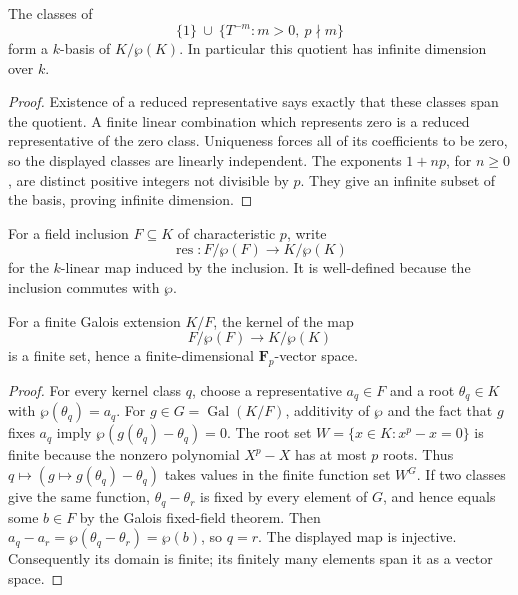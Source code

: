 \begin{lemma}
\label{lem:artin-schreier-quotient-basis}
\leanok
The classes of
\[
 \{1\}\ \cup\ \{T^{-m}:m>0,\ p\nmid m\}
\]
form a $k$-basis of $K/\wp(K)$. In particular this quotient
has infinite dimension over $k$.
\end{lemma}

\begin{proof}
Existence of a reduced representative says exactly that these
classes span the quotient. A finite linear combination which
represents zero is a reduced representative of the zero
class. Uniqueness forces all of its coefficients to be zero,
so the displayed classes are linearly independent.
The exponents $1+np$, for $n\ge0$, are distinct positive
integers not divisible by $p$. They give an infinite subset
of the basis, proving infinite dimension.
\end{proof}

For a field inclusion $F\subseteq K$ of characteristic $p$,
write
\[
 \operatorname{res}:F/\wp(F)\longrightarrow K/\wp(K)
\]
for the $k$-linear map induced by the inclusion. It is
well-defined because the inclusion commutes with $\wp$.

\begin{lemma}
\label{lem:artin-schreier-restriction-finite-kernel}
\leanok
For a finite Galois extension $K/F$, the kernel of the map
\[
 F/\wp(F)\longrightarrow K/\wp(K)
\]
is a finite set, hence a finite-dimensional $\mathbf F_p$-vector space.
\end{lemma}

\begin{proof}
For every kernel class $q$, choose a representative $a_q\in F$
and a root $\theta_q\in K$ with $\wp(\theta_q)=a_q$.
For $g\in G=\operatorname{Gal}(K/F)$, additivity of $\wp$
and the fact that $g$ fixes $a_q$ imply
$\wp(g(\theta_q)-\theta_q)=0$.
The root set $W=\{x\in K:x^p-x=0\}$ is finite because the
nonzero polynomial $X^p-X$ has at most $p$ roots.
Thus $q\mapsto(g\mapsto g(\theta_q)-\theta_q)$ takes values
in the finite function set $W^G$.
If two classes give the same function, $\theta_q-\theta_r$
is fixed by every element of $G$, and hence equals some $b\in F$
by the Galois fixed-field theorem. Then
$a_q-a_r=\wp(\theta_q-\theta_r)=\wp(b)$, so $q=r$.
The displayed map is injective. Consequently its domain is finite;
its finitely many elements span it as a vector space.
\end{proof}

